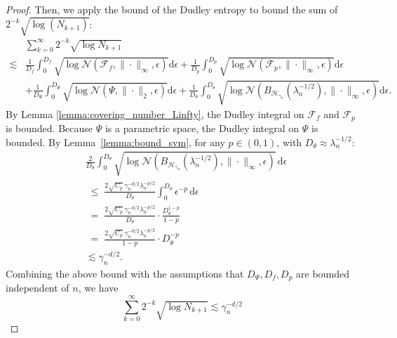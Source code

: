 \documentclass[12pt]{article}
\begin{document}
\begin{proof}
\noindent Then, we apply the bound of the Dudley entropy to bound the sum of $2^{-k}\sqrt{\log(N_{k+1})}$:
\begin{align*}
&\sum_{k=0}^\infty 2^{-k}\sqrt{\log N_{k+1}}
\;\\
\lesssim & \frac{1}{D_f}\int_0^{D_f}\sqrt{\log\mathcal{N}(\mathcal{F}_f,\|\cdot\|_\infty,\epsilon)}\mathrm{d}\epsilon + \frac{1}{D_p}\int_0^{D_p}\sqrt{\log\mathcal{N}(\mathcal{F}_p,\|\cdot\|_\infty,\epsilon)}\mathrm{d}\epsilon\\
& + \frac{1}{D_\Psi}\int_0^{D_\Psi}\sqrt{\log\mathcal{N}(\Psi,\|\cdot\|_2,\epsilon)}\mathrm{d}\epsilon + \frac{1}{D_\theta}\int_0^{D_\theta}\sqrt{\log\mathcal{N}(B_{\mathcal{H}_{\gamma_n}}(\lambda_n^{-1/2}),\|\cdot\|_\infty,\epsilon)}\mathrm{d}\epsilon.
\end{align*}
By Lemma \ref{lemma:covering_number_Linfty}, the Dudley integral on $\mathcal{F}_f$ and $\mathcal{F}_p$ is bounded. Because $\Psi$ is a parametric space, the Dudley integral on $\Psi$ is bounded. By Lemma~\ref{lemma:bound_svm}, for any $p\in(0,1)$, with $D_\theta \approx \lambda_n^{-1/2}$:
\begin{align*}
&\frac{2}{D_\theta}\int_0^{D_\theta}\!\sqrt{\log\mathcal{N}(B_{\mathcal{H}_{\gamma_n}}(\lambda_n^{-1/2}),\|\cdot\|_\infty,\epsilon)}\,\mathrm{d}\epsilon\\
&\;\leq\; \frac{2\sqrt{C_p}\,\gamma_n^{-d/2}\lambda_n^{-p/2}}{D_\theta}
\int_0^{D_\theta}\!\epsilon^{-p}\,\mathrm{d}\epsilon\\
&\;=\; \frac{2\sqrt{C_p}\,\gamma_n^{-d/2}\lambda_n^{-p/2}}{D_\theta}\cdot\frac{D_\theta^{1-p}}{1-p}\\
&\;=\; \frac{2\sqrt{C_p}\,\gamma_n^{-d/2}\lambda_n^{-p/2}}{1-p}\cdot D_\theta^{-p}\\
&\lesssim \gamma_n^{-d/2}.
\end{align*}
Combining the above bound with the assumptions that $D_\Psi, D_f,D_p$ are bounded independent of $n$, we have 
\begin{equation}\label{eq:dudley_2k}
    \sum_{k=0}^\infty 2^{-k}\sqrt{\log N_{k+1}}\lesssim \gamma_n^{-d/2}
\end{equation}


\end{proof}
\end{document}
